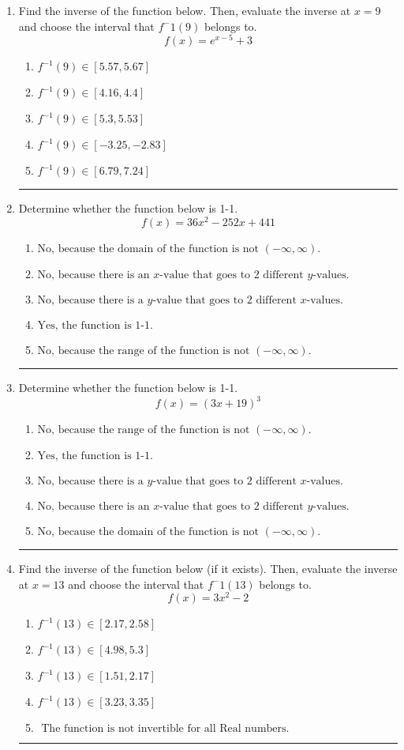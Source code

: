 \documentclass[14pt]{extbook}
\newcommand{\litem}[1]{\item#1\hspace*{-1cm}\rule{\textwidth}{0.4pt}}
\begin{document}
\begin{enumerate}
{\begin{enumerate}[label=\Alph*.]
\end{enumerate} }
\litem{
Find the inverse of the function below. Then, evaluate the inverse at $x = 9$ and choose the interval that $f^-1(9)$ belongs to.\[ f(x) = e^{x-5}+3 \]\begin{enumerate}[label=\Alph*.]
\item \( f^{-1}(9) \in [5.57, 5.67] \)
\item \( f^{-1}(9) \in [4.16, 4.4] \)
\item \( f^{-1}(9) \in [5.3, 5.53] \)
\item \( f^{-1}(9) \in [-3.25, -2.83] \)
\item \( f^{-1}(9) \in [6.79, 7.24] \)

\end{enumerate} }
\litem{
Determine whether the function below is 1-1.\[ f(x) = 36 x^2 - 252 x + 441 \]\begin{enumerate}[label=\Alph*.]
\item \( \text{No, because the domain of the function is not $(-\infty, \infty)$.} \)
\item \( \text{No, because there is an $x$-value that goes to 2 different $y$-values.} \)
\item \( \text{No, because there is a $y$-value that goes to 2 different $x$-values.} \)
\item \( \text{Yes, the function is 1-1.} \)
\item \( \text{No, because the range of the function is not $(-\infty, \infty)$.} \)

\end{enumerate} }
\litem{
Determine whether the function below is 1-1.\[ f(x) = (3 x + 19)^3 \]\begin{enumerate}[label=\Alph*.]
\item \( \text{No, because the range of the function is not $(-\infty, \infty)$.} \)
\item \( \text{Yes, the function is 1-1.} \)
\item \( \text{No, because there is a $y$-value that goes to 2 different $x$-values.} \)
\item \( \text{No, because there is an $x$-value that goes to 2 different $y$-values.} \)
\item \( \text{No, because the domain of the function is not $(-\infty, \infty)$.} \)

\end{enumerate} }
\litem{
Find the inverse of the function below (if it exists). Then, evaluate the inverse at $x = 13$ and choose the interval that $f^-1(13)$ belongs to.\[ f(x) = 3 x^2 - 2 \]\begin{enumerate}[label=\Alph*.]
\item \( f^{-1}(13) \in [2.17, 2.58] \)
\item \( f^{-1}(13) \in [4.98, 5.3] \)
\item \( f^{-1}(13) \in [1.51, 2.17] \)
\item \( f^{-1}(13) \in [3.23, 3.35] \)
\item \( \text{ The function is not invertible for all Real numbers. } \)


\end{enumerate}}
\end{enumerate}
\end{document}
